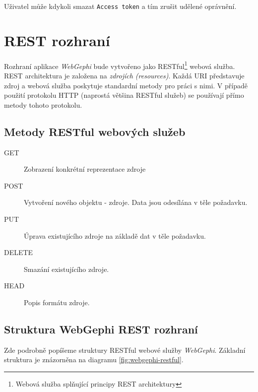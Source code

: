 \documentclass[thesis=M,czech]{FITthesis}[2014/05/6]
\begin{document}
Uživatel může kdykoli smazat \texttt{Access token} a tím zrušit udělené oprávnění.

\section{REST rozhraní}
Rozhraní aplikace \textit{WebGephi} bude vytvořeno jako RESTful\footnote{Webová služba splňující principy REST architektury} webová služba. REST architektura je 
založena na \textit{zdrojích (resources)}. Každá URI představuje zdroj a webová služba poskytuje standardní metody pro práci s nimi. V případě použití protokolu HTTP (naprostá většina RESTful služeb) se 
používají přímo metody tohoto protokolu.

\subsection{Metody RESTful webových služeb}
\begin{description}
  \item[GET] Zobrazení konkrétní reprezentace zdroje
  \item[POST] Vytvoření nového objektu - zdroje. Data jsou odesílána v těle požadavku. 
  \item[PUT] Úprava existujícího zdroje na základě dat v těle požadavku.
  \item[DELETE] Smazání existujícího zdroje.
  \item[HEAD] Popis formátu zdroje.
\end{description}
 

\subsection{Struktura WebGephi REST rozhraní}
Zde podrobně popíšeme struktury RESTful webové služby \textit{WebGephi}. Základní struktura je znázorněna na diagramu \ref{fig:webgephi-restful}.
\end{document}
